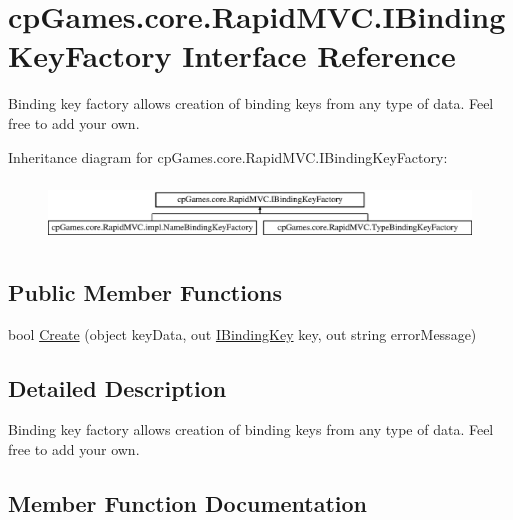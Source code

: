 \hypertarget{interfacecp_games_1_1core_1_1_rapid_m_v_c_1_1_i_binding_key_factory}{}\section{cp\+Games.\+core.\+Rapid\+M\+V\+C.\+I\+Binding\+Key\+Factory Interface Reference}
\label{interfacecp_games_1_1core_1_1_rapid_m_v_c_1_1_i_binding_key_factory}


Binding key factory allows creation of binding keys from any type of data. Feel free to add your own.  


Inheritance diagram for cp\+Games.\+core.\+Rapid\+M\+V\+C.\+I\+Binding\+Key\+Factory\+:\begin{figure}[H]
\begin{center}
\leavevmode
\includegraphics[height=1.661721cm]{interfacecp_games_1_1core_1_1_rapid_m_v_c_1_1_i_binding_key_factory}
\end{center}
\end{figure}
\subsection*{Public Member Functions}
\begin{DoxyCompactItemize}
\item 
bool \mbox{\hyperlink{interfacecp_games_1_1core_1_1_rapid_m_v_c_1_1_i_binding_key_factory_acebadb5b1ee05c449b3872428ce554ff}{Create}} (object key\+Data, out \mbox{\hyperlink{interfacecp_games_1_1core_1_1_rapid_m_v_c_1_1_i_binding_key}{I\+Binding\+Key}} key, out string error\+Message)
\end{DoxyCompactItemize}


\subsection{Detailed Description}
Binding key factory allows creation of binding keys from any type of data. Feel free to add your own. 



\subsection{Member Function Documentation}
\mbox{\label{interfacecp_games_1_1core_1_1_rapid_m_v_c_1_1_i_binding_key_factory_acebadb5b1ee05c449b3872428ce554ff}} 
